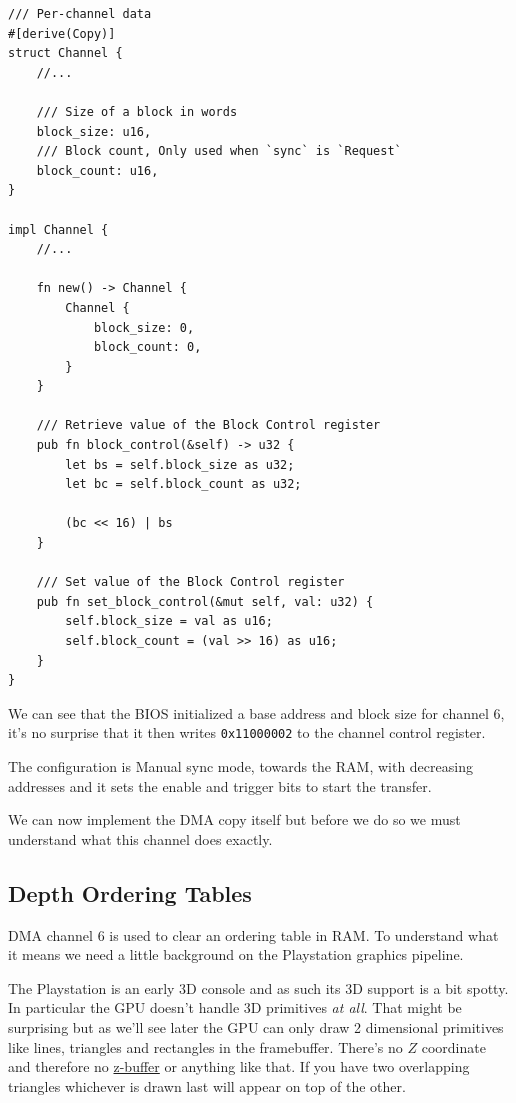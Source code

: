 \documentclass[a4paper]{article}
\newcommand{\code}[1] {\texttt{#1}}
\begin{document}
\begin{lstlisting}
/// Per-channel data
#[derive(Copy)]
struct Channel {
    //...

    /// Size of a block in words
    block_size: u16,
    /// Block count, Only used when `sync` is `Request`
    block_count: u16,
}

impl Channel {
    //...

    fn new() -> Channel {
        Channel {
            block_size: 0,
            block_count: 0,
        }
    }

    /// Retrieve value of the Block Control register
    pub fn block_control(&self) -> u32 {
        let bs = self.block_size as u32;
        let bc = self.block_count as u32;

        (bc << 16) | bs
    }

    /// Set value of the Block Control register
    pub fn set_block_control(&mut self, val: u32) {
        self.block_size = val as u16;
        self.block_count = (val >> 16) as u16;
    }
}
\end{lstlisting}

We can see that the BIOS initialized a base address and block size for
channel 6, it's no surprise that it then writes \code{0x11000002} to the
channel control register.

The configuration is Manual sync mode, towards the RAM, with
decreasing addresses and it sets the enable and trigger bits to start
the transfer.

We can now implement the DMA copy itself but before we do so we must
understand what this channel does exactly.

\subsection{Depth Ordering Tables}

DMA channel 6 is used to clear an ordering table in RAM. To understand
what it means we need a little background on the Playstation graphics
pipeline.

The Playstation is an early 3D console and as such its 3D support is a
bit spotty. In particular the GPU doesn't handle 3D primitives
\emph{at all}. That might be surprising but as we'll see later the GPU
can only draw 2 dimensional primitives like lines, triangles and
rectangles in the framebuffer. There's no $Z$ coordinate and therefore
no \href{https://en.wikipedia.org/wiki/Z-buffering}{z-buffer} or
anything like that. If you have two overlapping triangles whichever is
drawn last will appear on top of the other.
\end{document}
